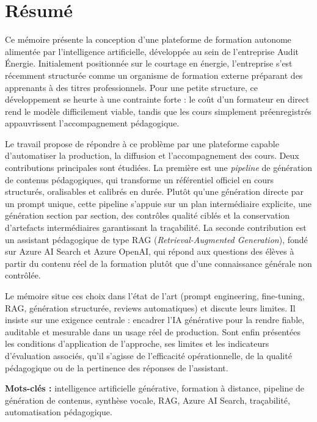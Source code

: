 \documentclass[12pt,a4paper]{article}
\begin{document}
\section*{Résumé}

Ce mémoire présente la conception d'une plateforme de formation autonome alimentée par
l'intelligence artificielle, développée au sein de l'entreprise Audit Énergie. Initialement
positionnée sur le courtage en énergie, l'entreprise s'est récemment structurée comme un
organisme de formation externe préparant des apprenants à des titres professionnels. Pour
une petite structure, ce développement se heurte à une contrainte forte : le coût d'un
formateur en direct rend le modèle difficilement viable, tandis que les cours simplement
préenregistrés appauvrissent l'accompagnement pédagogique.

Le travail propose de répondre à ce problème par une plateforme capable d'automatiser la
production, la diffusion et l'accompagnement des cours. Deux contributions principales sont
étudiées. La première est une \emph{pipeline} de génération de contenus pédagogiques, qui
transforme un référentiel officiel en cours structurés, oralisables et calibrés en durée. Plutôt
qu'une génération directe par un prompt unique, cette pipeline s'appuie sur un plan
intermédiaire explicite, une génération section par section, des contrôles qualité ciblés et la
conservation d'artefacts intermédiaires garantissant la traçabilité. La seconde contribution est
un assistant pédagogique de type RAG (\emph{Retrieval-Augmented Generation}), fondé sur
Azure AI Search et Azure OpenAI, qui répond aux questions des élèves à partir du contenu réel
de la formation plutôt que d'une connaissance générale non contrôlée.

Le mémoire situe ces choix dans l'état de l'art (prompt engineering, fine-tuning, RAG,
génération structurée, reviews automatiques) et discute leurs limites. Il insiste sur une
exigence centrale : encadrer l'IA générative pour la rendre fiable, auditable et mesurable dans
un usage réel de production. Sont enfin présentées les conditions d'application de l'approche,
ses limites et les indicateurs d'évaluation associés, qu'il s'agisse de l'efficacité opérationnelle,
de la qualité pédagogique ou de la pertinence des réponses de l'assistant.

\vspace{0.4cm}
\noindent\textbf{Mots-clés :} intelligence artificielle générative, formation à distance,
pipeline de génération de contenus, synthèse vocale, RAG, Azure AI Search, traçabilité,
automatisation pédagogique.
\end{document}
